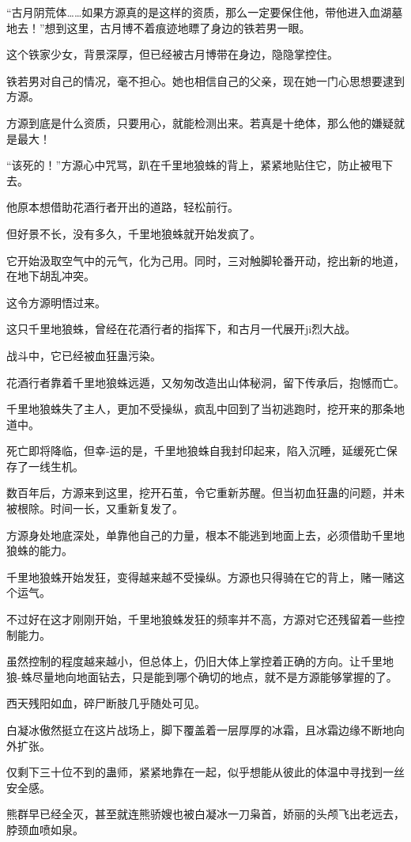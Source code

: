 \begin{this_body}
“古月阴荒体……如果方源真的是这样的资质，那么一定要保住他，带他进入血湖墓地去！”想到这里，古月博不着痕迹地瞟了身边的铁若男一眼。

这个铁家少女，背景深厚，但已经被古月博带在身边，隐隐掌控住。

铁若男对自己的情况，毫不担心。她也相信自己的父亲，现在她一门心思想要逮到方源。

方源到底是什么资质，只要用心，就能检测出来。若真是十绝体，那么他的嫌疑就是最大！

“该死的！”方源心中咒骂，趴在千里地狼蛛的背上，紧紧地贴住它，防止被甩下去。

他原本想借助花酒行者开出的道路，轻松前行。

但好景不长，没有多久，千里地狼蛛就开始发疯了。

它开始汲取空气中的元气，化为己用。同时，三对触脚轮番开动，挖出新的地道，在地下胡乱冲突。

这令方源明悟过来。

这只千里地狼蛛，曾经在花酒行者的指挥下，和古月一代展开ji烈大战。

战斗中，它已经被血狂蛊污染。

花酒行者靠着千里地狼蛛远遁，又匆匆改造出山体秘洞，留下传承后，抱憾而亡。

千里地狼蛛失了主人，更加不受操纵，疯乱中回到了当初逃跑时，挖开来的那条地道中。

死亡即将降临，但幸-运的是，千里地狼蛛自我封印起来，陷入沉睡，延缓死亡保存了一线生机。

数百年后，方源来到这里，挖开石茧，令它重新苏醒。但当初血狂蛊的问题，并未被根除。时间一长，又重新复发了。

方源身处地底深处，单靠他自己的力量，根本不能逃到地面上去，必须借助千里地狼蛛的能力。

千里地狼蛛开始发狂，变得越来越不受操纵。方源也只得骑在它的背上，赌一赌这个运气。

不过好在这才刚刚开始，千里地狼蛛发狂的频率并不高，方源对它还残留着一些控制能力。

虽然控制的程度越来越小，但总体上，仍旧大体上掌控着正确的方向。让千里地狼-蛛尽量地向地面钻去，只是能到哪个确切的地点，就不是方源能够掌握的了。

西天残阳如血，碎尸断肢几乎随处可见。

白凝冰傲然挺立在这片战场上，脚下覆盖着一层厚厚的冰霜，且冰霜边缘不断地向外扩张。

仅剩下三十位不到的蛊师，紧紧地靠在一起，似乎想能从彼此的体温中寻找到一丝安全感。

熊群早已经全灭，甚至就连熊骄嫂也被白凝冰一刀枭首，娇丽的头颅飞出老远去，脖颈血喷如泉。


\end{this_body}
